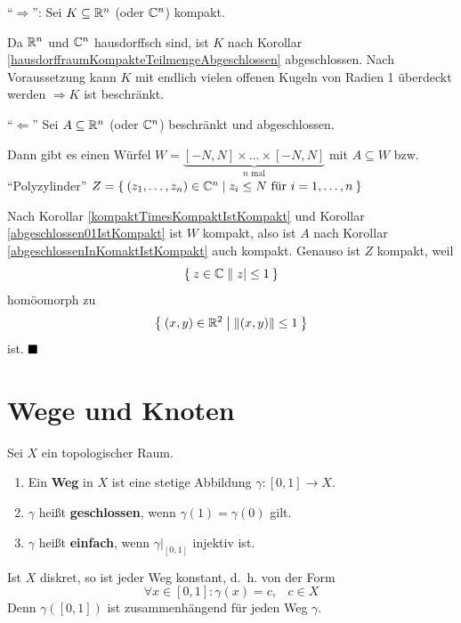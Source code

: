 \begin{beweis}
    \enquote{$\Rightarrow$}: Sei $K \subseteq \mathbb{R}^n$ (oder $\mathbb{C}^n$)
    kompakt.

    Da $\mathbb{R}^n$ und $\mathbb{C}^n$ hausdorffsch sind, ist $K$ nach Korollar
    \ref{hausdorffraumKompakteTeilmengeAbgeschlossen} abgeschlossen.
    Nach Voraussetzung kann $K$ mit endlich vielen offenen Kugeln von 
    Radien 1 überdeckt werden $\Rightarrow K$ ist beschränkt.

    \enquote{$\Leftarrow$} Sei $A \subseteq \mathbb{R}^n$ (oder $\mathbb{C}^n$)
    beschränkt und abgeschlossen.

    Dann gibt es einen Würfel $W = \underbrace{[-N, N] \times \dots \times [-N, N]}_{n \text{ mal}}$
    mit $A \subseteq W$ bzw. \enquote{Polyzylinder}
    $Z = \Set{(z_1, \dots, z_n) \in \ensuremath{\mathbb{C}}^n | z_i \leq N \text{ für } i= 1, \dots, n}$

    Nach Korollar \ref{kompaktTimesKompaktIstKompakt} und Korollar
    \ref{abgeschlossen01IstKompakt} ist $W$ kompakt, also ist $A$
    nach Korollar \ref{abgeschlossenInKomaktIstKompakt} auch kompakt.
    Genauso ist $Z$ kompakt, weil 
    \[\Set{z \in \ensuremath{\mathbb{C}}| |z| \leq 1}\]
    homöomorph zu
    \[\Set{(x,y) \in \ensuremath{\mathbb{R}}^2 | \|(x,y)\| \leq 1}\]
    ist. $\qed$
\end{beweis}

\section{Wege und Knoten}
\begin{definition}
    Sei $X$ ein topologischer Raum. 
    \begin{enumerate}[label=\alph*)]
        \item Ein \textbf{Weg} in $X$ ist eine stetige Abbildung $\gamma:[0,1] \rightarrow X$.
        \item $\gamma$ heißt \textbf{geschlossen}, wenn $\gamma(1) = \gamma(0)$ gilt.
        \item $\gamma$ heißt \textbf{einfach}, wenn $\gamma|_{[0,1]}$ 
              injektiv ist.
    \end{enumerate}
\end{definition}

\begin{beispiel}
    Ist $X$ diskret, so ist jeder Weg konstant, d.~h. von der Form
    \[\forall x \in [0,1]: \gamma(x) = c, \;\;\; c \in X\]
    Denn $\gamma([0,1])$ ist zusammenhängend für jeden Weg $\gamma$.
\end{beispiel}

